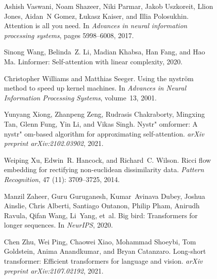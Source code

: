 \documentclass{article}
\begin{document}
\begin{figure}[t]
\begin{center}
\begin{thebibliography}{29}
Ashish Vaswani, Noam Shazeer, Niki Parmar, Jakob Uszkoreit, Llion Jones,
  Aidan~N Gomez, {\L}ukasz Kaiser, and Illia Polosukhin.
\newblock Attention is all you need.
\newblock In \emph{Advances in neural information processing systems}, pages
  5998--6008, 2017{}.

Sinong Wang, Belinda~Z. Li, Madian Khabsa, Han Fang, and Hao Ma.
\newblock Linformer: Self-attention with linear complexity, 2020.

Christopher Williams and Matthias Seeger.
\newblock Using the nystr\"{o}m method to speed up kernel machines.
\newblock In \emph{Advances in Neural Information Processing Systems},
  volume~13, 2001.

Yunyang Xiong, Zhanpeng Zeng, Rudrasis Chakraborty, Mingxing Tan, Glenn Fung,
  Yin Li, and Vikas Singh.
\newblock Nystr" omformer: A nystr" om-based algorithm
  for approximating self-attention.
\newblock \emph{arXiv preprint arXiv:2102.03902}, 2021.

Weiping Xu, Edwin~R. Hancock, and Richard~C. Wilson.
\newblock Ricci flow embedding for rectifying non-euclidean dissimilarity data.
\newblock \emph{Pattern Recognition}, 47 (11): 3709--3725,
  2014.

Manzil Zaheer, Guru Guruganesh, Kumar~Avinava Dubey, Joshua Ainslie, Chris
  Alberti, Santiago Ontanon, Philip Pham, Anirudh Ravula, Qifan Wang, Li~Yang,
  et~al.
\newblock Big bird: Transformers for longer sequences.
\newblock In \emph{NeurIPS}, 2020.

Chen Zhu, Wei Ping, Chaowei Xiao, Mohammad Shoeybi, Tom Goldstein, Anima
  Anandkumar, and Bryan Catanzaro.
\newblock Long-short transformer: Efficient transformers for language and
  vision.
\newblock \emph{arXiv preprint arXiv:2107.02192}, 2021.

\end{thebibliography}




\end{center}
\end{figure}
\end{document}
